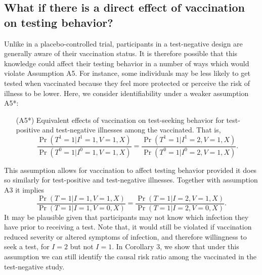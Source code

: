 \begin{appendix}
\subsection{What if there is a direct effect of vaccination on testing behavior?}\label{sec:de_testing}
Unlike in a placebo-controlled trial, participants in a test-negative design are generally aware of their vaccination status. It is therefore possible that this knowledge could affect their testing behavior in a number of ways which would violate Assumption A5. For instance, some individuals may be less likely to get tested when vaccinated because they feel more protected or perceive the risk of illness to be lower. Here, we consider identifiability under a weaker assumption A5*:
\begin{itemize}
    \item[(A5*)] Equivalent effects of vaccination on test-seeking behavior for test-positive and test-negative illnesses among the vaccinated. That is, 
    \begin{equation}
    \dfrac{\Pr(T^1 = 1 | I^1 = 1, V = 1, X)}{\Pr(T^0 = 1 | I^0 = 1, V = 1, X)} = \dfrac{\Pr(T^1 = 1 | I^1 = 2, V = 1, X)}{\Pr(T^0 = 1 | I^0 = 2, V = 1, X)}.
\end{equation}
\end{itemize}
This assumption allows for vaccination to affect testing behavior provided it does so similarly for test-positive and test-negative illnesses. Together with assumption A3 it implies
\begin{equation*}
    \dfrac{\Pr(T = 1 | I = 1, V = 1, X)}{\Pr(T = 1 | I = 1, V = 0, X)} = \dfrac{\Pr(T = 1 | I = 2, V = 1, X)}{\Pr(T = 1 | I = 2, V = 0, X)}.
\end{equation*}
It may be plausible given that participants may not know which infection they have prior to receiving a test. Note that, it would still be violated if vaccination reduced severity or altered symptoms of infection, and therefore willingness to seek a test, for $I=2$ but not $I=1$. In Corollary 3, we show that under this assumption we can still identify the causal risk ratio among the vaccinated in the test-negative study. 
\vspace{1em}



\end{appendix}
